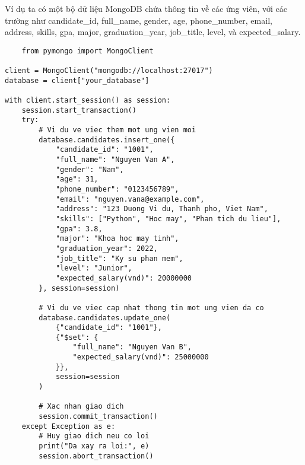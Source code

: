 Ví dụ ta có một bộ dữ liệu MongoDB chứa thông tin về các ứng viên, với các trường như candidate\_id, full\_name, gender, age, phone\_number, email, address, skills, gpa, major, graduation\_year, job\_title, level, và expected\_salary.
\begin{lstlisting}
    from pymongo import MongoClient

client = MongoClient("mongodb://localhost:27017")
database = client["your_database"]

with client.start_session() as session:
    session.start_transaction()
    try:
        # Vi du ve viec them mot ung vien moi
        database.candidates.insert_one({
            "candidate_id": "1001",
            "full_name": "Nguyen Van A",
            "gender": "Nam",
            "age": 31,
            "phone_number": "0123456789",
            "email": "nguyen.vana@example.com",
            "address": "123 Duong Vi du, Thanh pho, Viet Nam",
            "skills": ["Python", "Hoc may", "Phan tich du lieu"],
            "gpa": 3.8,
            "major": "Khoa hoc may tinh",
            "graduation_year": 2022,
            "job_title": "Ky su phan mem",
            "level": "Junior",
            "expected_salary(vnd)": 20000000
        }, session=session)

        # Vi du ve viec cap nhat thong tin mot ung vien da co
        database.candidates.update_one(
            {"candidate_id": "1001"},
            {"$set": {
                "full_name": "Nguyen Van B",
                "expected_salary(vnd)": 25000000
            }},
            session=session
        )

        # Xac nhan giao dich
        session.commit_transaction()
    except Exception as e:
        # Huy giao dich neu co loi
        print("Da xay ra loi:", e)
        session.abort_transaction()

\end{lstlisting}

